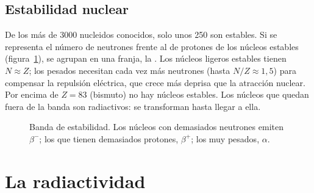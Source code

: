 \subsection{Estabilidad nuclear}\label{subsec:nuc-estabilidad}

De los más de 3000 nucleidos conocidos, solo unos 250 son estables. Si se representa el número de neutrones frente al de protones de
los núcleos estables (figura~\ref{fig:nuc-estabilidad}), se agrupan en una franja, la . Los núcleos ligeros
estables tienen \(N \approx Z\); los pesados necesitan cada vez más neutrones (hasta \(N/Z \approx 1{,}5\)) para compensar la repulsión
eléctrica, que crece más deprisa que la atracción nuclear. Por encima de \(Z = 83\) (bismuto) no hay núcleos estables. Los núcleos que
quedan fuera de la banda son radiactivos: se transforman hasta llegar a ella.

\begin{figure}[H]
    \centering
    \caption{Banda de estabilidad. Los núcleos con demasiados neutrones emiten \(\beta^-\); los que tienen demasiados protones,
    \(\beta^+\); los muy pesados, \(\alpha\).}
    \label{fig:nuc-estabilidad}
\end{figure}

\section{La radiactividad}\label{sec:nuc-radiactividad}

